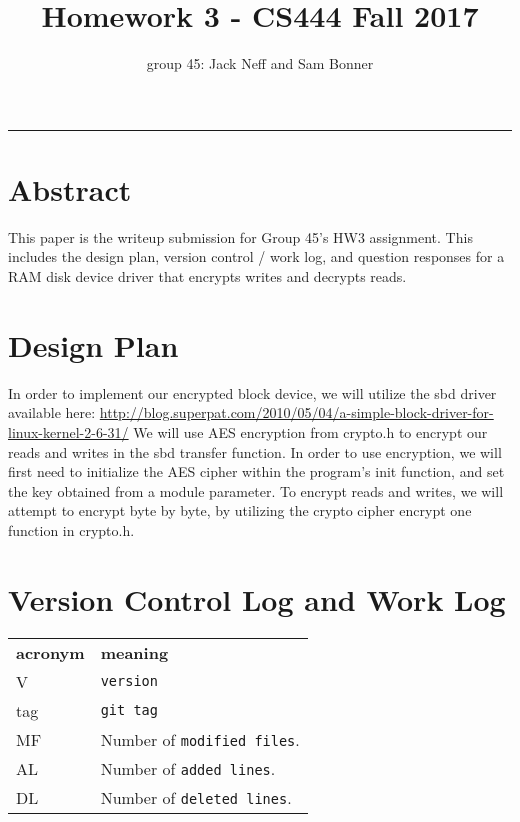 \documentclass[letterpaper,10pt,fleqn]{article}
\title{Homework 3 - CS444 Fall 2017}
\author{group 45: Jack Neff and Sam Bonner}
\begin{document}
\maketitle
\hrule

\section*{Abstract}

This paper is the writeup submission for Group 45's HW3 assignment. This includes the design plan, version control / work log, and question responses for a RAM disk device driver that encrypts writes and decrypts reads.

\pagebreak
\section*{Design Plan}

In order to implement our encrypted block device, we will utilize the sbd driver available here: \url{http://blog.superpat.com/2010/05/04/a-simple-block-driver-for-linux-kernel-2-6-31/}
We will use AES encryption from crypto.h to encrypt our reads and writes in the sbd transfer function. In order to use encryption, we will first need to initialize the AES cipher within the program's init function, and set the key obtained from a module parameter. To encrypt reads and writes, we will attempt to encrypt byte by byte, by utilizing the crypto cipher encrypt one function in crypto.h.

\section*{Version Control Log and Work Log}
 
 \begin{tabular}{lp{8cm}}
  \label{tabular:legend:git-log}
  \textbf{acronym} & \textbf{meaning} \\
  V & \texttt{version} \\
  tag & \texttt{git tag} \\
  MF & Number of \texttt{modified files}. \\
  AL & Number of \texttt{added lines}. \\
  DL & Number of \texttt{deleted lines}. \\
\end{tabular}

\bigskip
\end{document}
